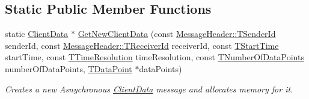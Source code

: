 \subsection*{Static Public Member Functions}
\begin{DoxyCompactItemize}
\item 
static \hyperlink{class_terra_swarm_1_1_asynchronous_1_1_client_data}{Client\-Data} $\ast$ \hyperlink{class_terra_swarm_1_1_asynchronous_1_1_client_data_abbae8a9d83addb3758fe00fbfeefae97}{Get\-New\-Client\-Data} (const \hyperlink{class_terra_swarm_1_1_message_header_a516b36855e2aad7cfbf8770f1b42784f}{Message\-Header\-::\-T\-Sender\-Id} sender\-Id, const \hyperlink{class_terra_swarm_1_1_message_header_aa3260702b182b6f88ddbdd3416e98df0}{Message\-Header\-::\-T\-Receiver\-Id} receiver\-Id, const \hyperlink{class_terra_swarm_1_1_asynchronous_1_1_client_data_a70b07646d3a13d9c2cb16ade44a49966}{T\-Start\-Time} start\-Time, const \hyperlink{class_terra_swarm_1_1_asynchronous_1_1_client_data_a626a7d114c405bceb24262253fe36c71}{T\-Time\-Resolution} time\-Resolution, const \hyperlink{class_terra_swarm_1_1_asynchronous_1_1_client_data_a690994afd0ba9b8eeb56ae679a5c64e8}{T\-Number\-Of\-Data\-Points} number\-Of\-Data\-Points, \hyperlink{class_terra_swarm_1_1_asynchronous_1_1_client_data_ac733720fed15e940f991de44f1bb514e}{T\-Data\-Point} $\ast$data\-Points)
\begin{DoxyCompactList}\small\item\em Creates a new Asnychronous \hyperlink{class_terra_swarm_1_1_asynchronous_1_1_client_data}{Client\-Data} message and allocates memory for it. \end{DoxyCompactList}\end{DoxyCompactItemize}
